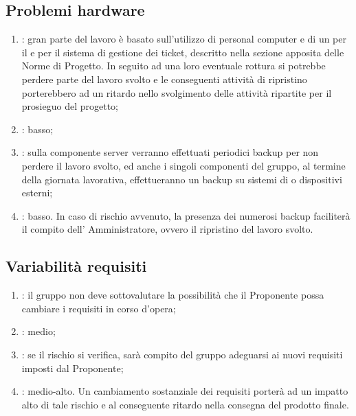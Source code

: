 \subsection{Problemi hardware}
\begin{enumerate}
\item {}: gran parte del lavoro è basato sull'utilizzo di personal computer e di un  per il  e per il sistema di gestione dei ticket, descritto nella sezione apposita delle Norme di Progetto. In seguito ad una loro eventuale rottura si potrebbe perdere parte del lavoro svolto e le conseguenti attività di ripristino porterebbero ad un ritardo nello svolgimento delle attività ripartite per il prosieguo del progetto;
\item {}: basso;
\item {}: sulla componente server verranno effettuati periodici backup per non perdere il lavoro svolto, ed anche i singoli componenti del gruppo, al termine della giornata lavorativa, effettueranno un backup su sistemi di  o dispositivi  esterni;
\item {}: basso. In caso di rischio avvenuto, la presenza dei numerosi backup faciliterà il compito dell' Amministratore, ovvero il ripristino del lavoro svolto.
\end{enumerate}

\subsection{Variabilità requisiti}
\begin{enumerate}
\item {}: il gruppo non deve sottovalutare la possibilità che il Proponente possa cambiare i requisiti in corso d'opera;
\item {}: medio;
\item {}: se il rischio si verifica, sarà compito del gruppo adeguarsi ai nuovi requisiti imposti dal Proponente;
\item {}: medio-alto. Un cambiamento sostanziale dei requisiti porterà ad un impatto alto di tale rischio e al conseguente ritardo nella consegna del prodotto finale.
\end{enumerate}

